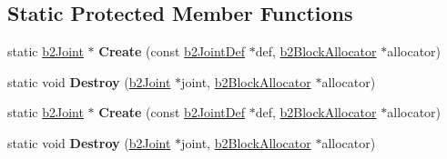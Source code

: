 \subsection*{Static Protected Member Functions}
\begin{DoxyCompactItemize}
\item 
\mbox{\label{classb2Joint_a2e500c93107d0bf6b0a21654528faeab}} 
static \hyperlink{classb2Joint}{b2\+Joint} $\ast$ {\bfseries Create} (const \hyperlink{structb2JointDef}{b2\+Joint\+Def} $\ast$def, \hyperlink{classb2BlockAllocator}{b2\+Block\+Allocator} $\ast$allocator)
\item 
\mbox{\label{classb2Joint_acf52946b6672d77f268b849ccb09e003}} 
static void {\bfseries Destroy} (\hyperlink{classb2Joint}{b2\+Joint} $\ast$joint, \hyperlink{classb2BlockAllocator}{b2\+Block\+Allocator} $\ast$allocator)
\item 
\mbox{\label{classb2Joint_afb5e48309bffa83a01d3f8a703269602}} 
static \hyperlink{classb2Joint}{b2\+Joint} $\ast$ {\bfseries Create} (const \hyperlink{structb2JointDef}{b2\+Joint\+Def} $\ast$def, \hyperlink{classb2BlockAllocator}{b2\+Block\+Allocator} $\ast$allocator)
\item 
\mbox{\label{classb2Joint_adfb955de2abe370a973a7158557e26be}} 
static void {\bfseries Destroy} (\hyperlink{classb2Joint}{b2\+Joint} $\ast$joint, \hyperlink{classb2BlockAllocator}{b2\+Block\+Allocator} $\ast$allocator)
\end{DoxyCompactItemize}
